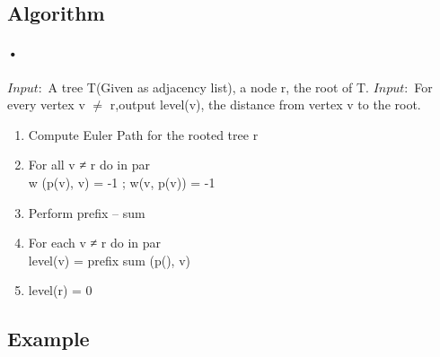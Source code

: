 \documentclass[twoside]{article}
\begin{document}
\subsection{Algorithm}
\paragraph{•}
$Input: $ A tree T(Given as adjacency list), a node r, the root of T.
$Input: $ For every vertex v $\neq$ r,output level(v), the distance from vertex v to the root.

\begin{enumerate}
\item Compute Euler Path for the rooted tree r
\item For all v ≠ r do in par \\
      w (p(v), v) = -1 ; w(v, p(v)) = -1
\item Perform prefix – sum 
\item For each v ≠ r do in par \\
      level(v) = prefix sum (p(), v)
\item level(r) = 0
\end{enumerate}

\subsection{Example}
\end{document}
